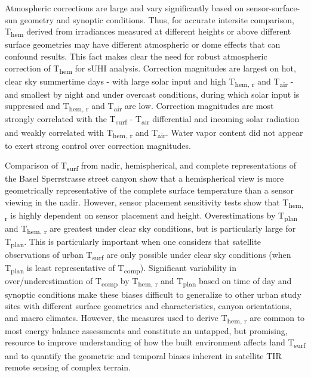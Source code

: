\begin{bibunit}
Atmospheric corrections are large and vary significantly based on sensor-surface-sun geometry and synoptic conditions. Thus, for accurate intersite comparison, T\textsubscript{hem} derived from irradiances measured at different heights or above different surface geometries may have different atmospheric or dome effects that can confound results. This fact makes clear the need for robust atmospheric correction of T\textsubscript{hem} for sUHI analysis. Correction magnitudes are largest on hot, clear sky summertime days - with large solar input and high T\textsubscript{hem, r} and T\textsubscript{air} - and smallest by night and under overcast conditions, during which solar input is suppressed and T\textsubscript{hem, r} and T\textsubscript{air} are low. Correction magnitudes are most strongly correlated with the T\textsubscript{surf} - T\textsubscript{air} differential and incoming solar radiation and weakly correlated with T\textsubscript{hem, r} and T\textsubscript{air}. Water vapor content did not appear to exert strong control over correction magnitudes.

Comparison of T\textsubscript{surf} from nadir, hemispherical, and complete representations of the Basel Sperrstrasse street canyon show that a hemispherical view is more geometrically representative of the complete surface temperature than a sensor viewing in the nadir. However, sensor placement sensitivity tests show that T\textsubscript{hem, r} is highly dependent on sensor placement and height. Overestimations by T\textsubscript{plan} and T\textsubscript{hem, r} are greatest under clear sky conditions, but is particularly large for T\textsubscript{plan}. This is particularly important when one considers that satellite observations of urban T\textsubscript{surf} are only possible under clear sky conditions (when T\textsubscript{plan} is least representative of T\textsubscript{comp}). Significant variability in over/underestimation of T\textsubscript{comp} by T\textsubscript{hem, r} and T\textsubscript{plan} based on time of day and synoptic conditions make these biases difficult to generalize to other urban study sites with different surface geometries and characteristics, canyon orientations, and macro climates. However, the measures used to derive T\textsubscript{hem, r} are common to most energy balance assessments and constitute an untapped, but promising, resource to improve understanding of how the built environment affects land T\textsubscript{surf} and to quantify the geometric and temporal biases inherent in satellite TIR remote sensing of complex terrain. 

\cleardoublepage 
{}  
\renewcommand*{\bibname}{References}

\putbib
\end{bibunit}